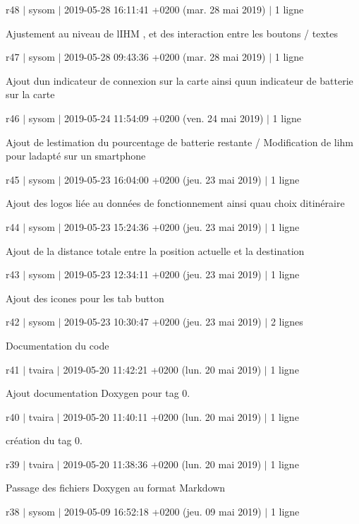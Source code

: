 r48 $\vert$ sysom $\vert$ 2019-\/05-\/28 16\+:11\+:41 +0200 (mar. 28 mai 2019) $\vert$ 1 ligne

Ajustement au niveau de l\textquotesingle{}I\+HM , et des interaction entre les boutons / textes

r47 $\vert$ sysom $\vert$ 2019-\/05-\/28 09\+:43\+:36 +0200 (mar. 28 mai 2019) $\vert$ 1 ligne

Ajout d\textquotesingle{}un indicateur de connexion sur la carte ainsi qu\textquotesingle{}un indicateur de batterie sur la carte

r46 $\vert$ sysom $\vert$ 2019-\/05-\/24 11\+:54\+:09 +0200 (ven. 24 mai 2019) $\vert$ 1 ligne

Ajout de l\textquotesingle{}estimation du pourcentage de batterie restante / Modification de l\textquotesingle{}ihm pour l\textquotesingle{}adapté sur un smartphone

r45 $\vert$ sysom $\vert$ 2019-\/05-\/23 16\+:04\+:00 +0200 (jeu. 23 mai 2019) $\vert$ 1 ligne

Ajout des logos liée au données de fonctionnement ainsi qu\textquotesingle{}au choix d\textquotesingle{}itinéraire

r44 $\vert$ sysom $\vert$ 2019-\/05-\/23 15\+:24\+:36 +0200 (jeu. 23 mai 2019) $\vert$ 1 ligne

Ajout de la distance totale entre la position actuelle et la destination

r43 $\vert$ sysom $\vert$ 2019-\/05-\/23 12\+:34\+:11 +0200 (jeu. 23 mai 2019) $\vert$ 1 ligne

Ajout des icones pour les tab button

r42 $\vert$ sysom $\vert$ 2019-\/05-\/23 10\+:30\+:47 +0200 (jeu. 23 mai 2019) $\vert$ 2 lignes

Documentation du code

r41 $\vert$ tvaira $\vert$ 2019-\/05-\/20 11\+:42\+:21 +0200 (lun. 20 mai 2019) $\vert$ 1 ligne

Ajout documentation Doxygen pour tag 0.

r40 $\vert$ tvaira $\vert$ 2019-\/05-\/20 11\+:40\+:11 +0200 (lun. 20 mai 2019) $\vert$ 1 ligne

création du tag 0.

r39 $\vert$ tvaira $\vert$ 2019-\/05-\/20 11\+:38\+:36 +0200 (lun. 20 mai 2019) $\vert$ 1 ligne

Passage des fichiers Doxygen au format Markdown

r38 $\vert$ sysom $\vert$ 2019-\/05-\/09 16\+:52\+:18 +0200 (jeu. 09 mai 2019) $\vert$ 1 ligne


